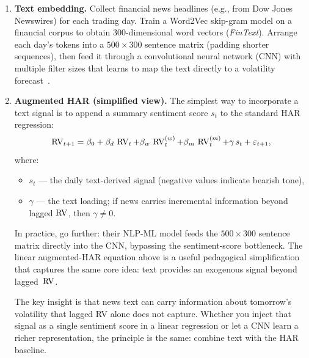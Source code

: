 \begin{enumerate}
  \item \textbf{Text embedding.}  Collect financial news headlines
        (e.g., from Dow Jones Newswires) for each trading day.  Train
        a Word2Vec skip-gram model on a financial corpus to obtain
        300-dimensional word vectors (\emph{FinText}).  Arrange each
        day's tokens into a $500 \times 300$ sentence matrix (padding
        shorter sequences), then feed it through a convolutional neural
        network (CNN) with multiple filter sizes that learns to map
        the text directly to a volatility
        forecast~\citep{RahimikiaZohrenPoon2021NLP}.
  \item \textbf{Augmented HAR (simplified view).}  The simplest way to
        incorporate a text signal is to append a summary sentiment score
        $s_t$ to the standard HAR regression:
        \begin{equation}\label{eq:har-nlp}
          \operatorname{RV}_{t+1} = \beta_0 + \beta_d\,\operatorname{RV}_t
            + \beta_w\,\operatorname{RV}_t^{(w)} + \beta_m\,\operatorname{RV}_t^{(m)}
            + \gamma\,s_t + \varepsilon_{t+1},
        \end{equation}
        where:
        \begin{itemize}
          \item $s_t$ --- the daily text-derived signal (negative values
                indicate bearish tone),
          \item $\gamma$ --- the text loading; if news carries
                incremental information beyond lagged $\operatorname{RV}$, then
                $\gamma \neq 0$.
        \end{itemize}
        In practice, \citet{RahimikiaZohrenPoon2021NLP} go further:
        their NLP-ML model feeds the $500 \times 300$ sentence matrix
        directly into the CNN, bypassing the sentiment-score bottleneck.
        The linear augmented-HAR equation above is a useful pedagogical
        simplification that captures the same core idea: text provides
        an exogenous signal beyond lagged~$\operatorname{RV}$.

        \begin{intuition}
        The key insight is that news text can carry information about
        tomorrow's volatility that lagged RV alone does not capture.
        Whether you inject that signal as a single sentiment score in
        a linear regression or let a CNN learn a richer representation,
        the principle is the same: combine text with the HAR baseline.
        \end{intuition}


\end{enumerate}
